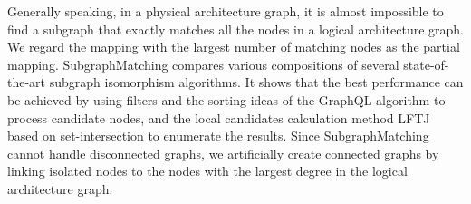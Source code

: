 \documentclass[journal]{IEEEtran}
\begin{document}
	Generally speaking, in a physical architecture graph, it is almost impossible to find a subgraph that exactly matches all the nodes in a logical architecture graph. We regard the mapping with the largest number of matching nodes as the partial mapping. SubgraphMatching compares various compositions of several state-of-the-art subgraph isomorphism algorithms.  
	It shows that the best performance can be achieved by using filters and the sorting ideas of the GraphQL algorithm to process candidate nodes, and the local candidates calculation method LFTJ based on set-intersection to enumerate the results. Since SubgraphMatching cannot handle disconnected graphs, we artificially create connected graphs by linking isolated nodes to the nodes with the largest degree in the logical architecture graph. %
\end{document}
